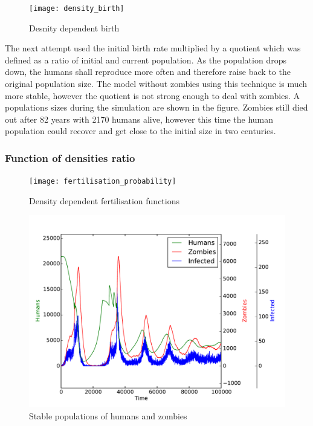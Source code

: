 \documentclass[a4paper]{article}
\begin{document}
\begin{figure}[pht]
    \centering
    \texttt{[image: density\_birth]}
    \caption{Desnity dependent birth}
\end{figure}

The next attempt used the initial birth rate multiplied by a quotient which was defined as a ratio of initial and current population.
As the population drops down, the humans shall reproduce more often and therefore raise back to the original population size.
The model without zombies using this technique is much more stable, however the quotient is not strong enough to deal with zombies.
A populations sizes during the simulation are shown in the figure.
Zombies still died out after 82 years with 2170 humans alive, however this time the human population could recover and get close to the initial size in two centuries.

\subsubsection{Function of densities ratio}

\begin{figure}[pht]
    \centering
    \texttt{[image: fertilisation\_probability]}
    \caption{Density dependent fertilisation functions}
\end{figure}

\begin{figure}[pht]
    \centering
    \includegraphics[width=\textwidth]{stable}
    \caption{Stable populations of humans and zombies}
\end{figure}
\end{document}
